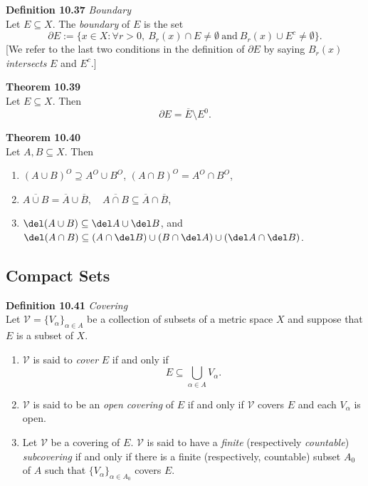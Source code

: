 \documentclass[8pt,landscape]{article}
\begin{document}
\begin{multicols}{3}
\textbf{Definition 10.37} \emph{Boundary} \\
Let $E \subseteq X$.
The \emph{boundary} of $E$ is the set
\[
    \partial E := \{x \in X : \forall r > 0, \ B_r(x) \cap E \neq \emptyset \
    \text{and} \ B_r(x) \cup E^c \neq \emptyset \}.
\]
[We refer to the last two conditions in the definition of $\partial E$ by saying
$B_r(x)$ \emph{intersects} $E$ and $E^c$.]


\textbf{Theorem 10.39} \\
Let $E \subseteq X$.
Then
\[
    \partial E = \overline{E} \setminus E^0.
\]


\textbf{Theorem 10.40} \\
Let $A, B \subseteq X$.
Then
\begin{enumerate}
    \item ${(A \cup B)}^O \supseteq A^O \cup B^O$, \quad
        ${(A \cap B)}^O = A^O \cap B^O$,
    \item $\overline{A \cup B} = \overline{A} \cup \overline{B}, \quad
        \overline{A \cap B} \subseteq \overline{A} \cap \overline{B}$,
    \item $\del (A \cup B) \subseteq \del A \cup \del B$, \quad and \quad
        $\del (A \cap B) \subseteq (A \cap \del B) \cup (B \cap \del A) \cup
        (\del A \cap \del B)$.
\end{enumerate}

\subsection{Compact Sets}

\textbf{Definition 10.41} \emph{Covering} \\
Let $\mathcal{V} = {\{V_\alpha\}}_{\alpha \in A}$ be a collection of subsets of a
metric space $X$ and suppose that $E$ is a subset of $X$.
\begin{enumerate}
    \item $\mathcal{V}$ is said to \emph{cover} $E$ if and only if
        \[
            E \subseteq \bigcup_{\alpha \in A} V_\alpha.
        \]

    \item $\mathcal{V}$ is said to be an \emph{open covering} of $E$ if and only if
        $\mathcal{V}$ covers $E$ and each $V_\alpha$ is open.
    \item Let $\mathcal{V}$ be a covering of $E$.
        $\mathcal{V}$ is said to have a \emph{finite} (respectively \emph{countable})
        \emph{subcovering} if and only if there is a finite (respectively, countable)
        subset $A_0$ of $A$ such that ${\{V_\alpha\}}_{\alpha \in A_0}$ covers $E$.
\end{enumerate}



\end{multicols}
\end{document}
